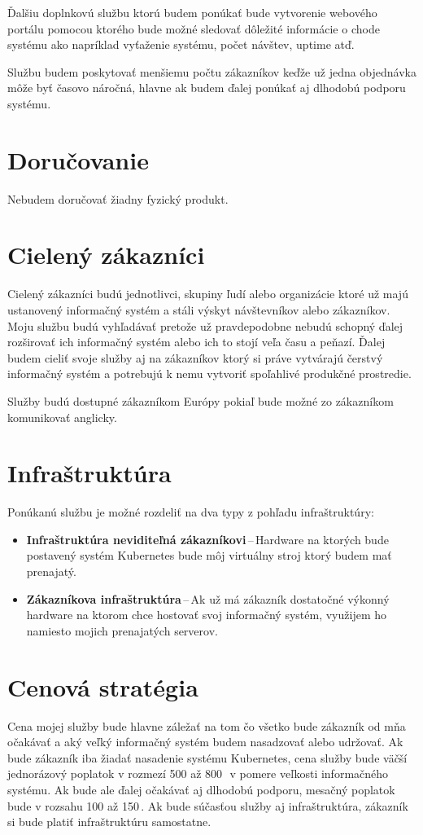 Ďalšiu doplnkovú službu ktorú budem ponúkať bude vytvorenie webového portálu pomocou ktorého bude možné sledovať dôležité informácie o chode systému ako napríklad vyťaženie systému, počet návštev, uptime atď.

Službu budem poskytovať menšiemu počtu zákazníkov keďže už jedna objednávka môže byť časovo náročná, hlavne ak budem ďalej ponúkať aj dlhodobú podporu systému.

\section{Doručovanie}

Nebudem doručovať žiadny fyzický produkt.

\section{Cielený zákazníci}

Cielený zákazníci budú jednotlivci, skupiny ľudí alebo organizácie ktoré už majú ustanovený informačný systém a stáli výskyt návštevníkov alebo zákazníkov. Moju službu budú vyhľadávať pretože už pravdepodobne nebudú schopný ďalej rozširovať ich informačný systém alebo ich to stojí veľa času a peňazí. Ďalej budem cieliť svoje služby aj na zákazníkov ktorý si práve vytvárajú čerstvý informačný systém a potrebujú k nemu vytvoriť spoľahlivé produkčné prostredie.

Služby budú dostupné zákazníkom Európy pokiaľ bude možné zo zákazníkom komunikovať anglicky.

\section{Infraštruktúra}

Ponúkanú službu je možné rozdeliť na dva typy z pohľadu infraštruktúry:
\begin{itemize}
  \item \textbf{Infraštruktúra neviditeľná zákazníkovi}\,--\,Hardware na ktorých bude postavený systém Kubernetes bude môj virtuálny stroj ktorý budem mať prenajatý.
  \item \textbf{Zákazníkova infraštruktúra}\,--\,Ak už má zákazník dostatočné výkonný hardware na ktorom chce hostovať svoj informačný systém, využijem ho namiesto mojich prenajatých serverov.
\end{itemize}

\section{Cenová stratégia}
Cena mojej služby bude hlavne záležať na tom čo všetko bude zákazník od mňa očakávať a aký veľký informačný systém budem nasadzovať alebo udržovať. Ak bude zákazník iba žiadať nasadenie systému Kubernetes, cena služby bude väčší jednorázový poplatok v rozmezí 500 až 800\,\texteuro\ v pomere veľkosti informačného systému. Ak bude ale ďalej očakávať aj dlhodobú podporu, mesačný poplatok bude v rozsahu 100 až 150\,\texteuro. Ak bude súčasťou služby aj infraštruktúra, zákazník si bude platiť infraštruktúru samostatne.


